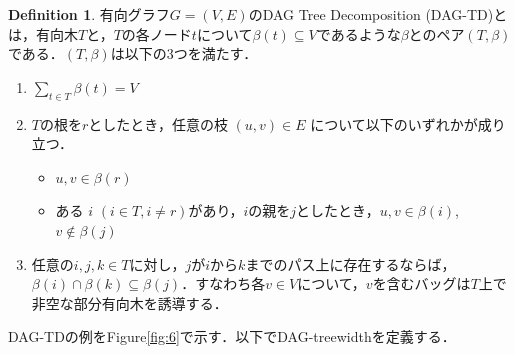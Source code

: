 \documentclass[master]{kuisthesis}		%
\theoremstyle{plain}
\theoremstyle{definition}
\newtheorem{definition*}{Definition}
\begin{document}
\begin{definition*}
 有向グラフ$G=(V, E)$のDAG Tree Decomposition (DAG-TD)とは，有向木$T$と，$T$の各ノード$t$について$\beta(t) \subseteq V$であるような$\beta$とのペア$(T, \beta)$である．$(T, \beta)$は以下の3つを満たす．
 
\begin{enumerate}
    \item $\sum_{t\in T} \beta(t) = V$ 
    \item $T$の根を$r$としたとき，任意の枝 $ (u, v) \in E $ について以下のいずれかが成り立つ．
    \begin{itemize}
          \item $u, v \in \beta(r)$
          \item ある $i$ $(i \in T, i \neq r)$があり，$i$の親を$j$としたとき，$u, v \in \beta(i)$, $v \notin \beta(j)$
    \end{itemize}
    \item 任意の$ i, j, k \in T$に対し，$j$が$i$から$k$までのパス上に存在するならば，$\beta(i) \cap \beta(k) \subseteq \beta(j)$．すなわち各$v \in V$について，$v$を含むバッグは$T$上で非空な部分有向木を誘導する．
    \end{enumerate}
\end{definition*}



DAG-TDの例をFigure\ref{fig:6}で示す．以下でDAG-treewidthを定義する．
\end{document}
